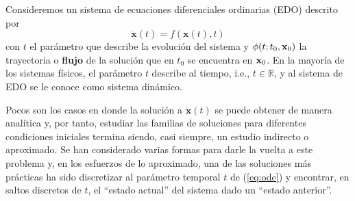 Consideremos un sistema de ecuaciones diferenciales ordinarias (EDO) descrito por 
\begin{equation}
\dot{\mathbf{x}}(t) = f(\mathbf{x}(t),t)
\label{eq:ode}
\end{equation}
con $t$ el parámetro que describe la evolución del sistema y $\phi(t;t_0,\mathbf{x}_0)$ la trayectoria o \textbf{flujo} de la solución que en $t_0$ se encuentra en $\mathbf{x}_0$. En la mayoría de los sistemas físicos, el parámetro $t$ describe al tiempo, i.e., $t \in \mathbb{R}$, y al sistema de EDO se le conoce como sistema dinámico.

Pocos son los casos en donde la solución a $\dot{\mathbf{x}}(t)$ se puede obtener de manera analítica y, por tanto, estudiar las familias de soluciones para diferentes condiciones iniciales termina siendo, casi siempre, un estudio indirecto o aproximado. Se han considerado varias formas para darle la vuelta a este problema y, en los esfuerzos de lo aproximado, una de las soluciones más prácticas ha sido discretizar al parámetro temporal $t$ de (\ref{eq:ode}) y encontrar, en saltos discretos de $t$, el ``estado actual'' del sistema dado un ``estado anterior''.

